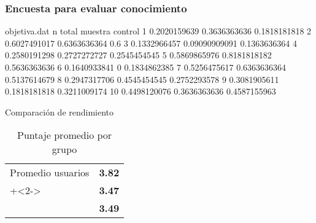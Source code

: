 \begin{frame}[t,fragile]
\frametitle{Encuesta para evaluar conocimiento}
\centering

\begin{filecontents}{objetiva.dat}
n	total        muestra	    control
1	0.2020159639 0.3636363636	0.1818181818
2	0.6027491017 0.6363636364	0.6
3	0.1332966457 0.09090909091	0.1363636364
4	0.2580191298 0.2727272727	0.2545454545
5	0.5869865976 0.8181818182	0.5636363636
6	0.1640933841 0	            0.1834862385
7	0.5256475617 0.6363636364	0.5137614679
8	0.2947317706 0.4545454545	0.2752293578
9	0.3081905611 0.1818181818	0.3211009174
10	0.4498120076 0.3636363636	0.4587155963
\end{filecontents}


\end{frame}
\begin{frame}{Comparación de rendimiento}

\begin{table}
\begin{tabular}{lr}
\toprule
Promedio usuarios & \textbf{3.82} \\
\onslide+<2->{Promedio control  & \textbf{3.47} \\\midrule}
\onslide+<3->{Promedio total    & \textbf{3.49}}
\\\bottomrule
\end{tabular}
\caption{Puntaje promedio por grupo}
\end{table}

\end{frame}

